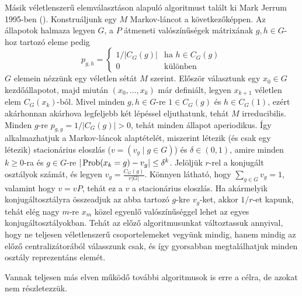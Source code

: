 Másik véletlenszerű elemválasztáson alapuló algoritmust talált ki Mark Jerrum 1995-ben (\cite{Jer95}).
Konstruáljunk egy $M$ Markov-láncot a következőképpen.
Az állapotok halmaza legyen $G$, a $P$ átmeneti valószínűségek mátrixának $g, h \in G$-hoz tartozó eleme pedig
\begin{equation*}
p_{g,h} =
\begin{cases}
1/|C_G(g)| & \text{ha $h \in C_G(g)$}\\
0 & \text{különben}
\end{cases}
\end{equation*}
$G$ elemein nézzünk egy véletlen sétát $M$ szerint. Először választunk egy $x_0 \in G$ kezdőállapotot, majd miután $(x_0, \dots, x_k)$ már definiált, legyen
$x_{k+1}$ véletlen elem $C_G(x_k)$-ból.
Mivel minden $g,h \in G$-re $1 \in C_G(g)$ és $h \in C_G(1)$, ezért akárhonnan akárhova legfeljebb két lépéssel eljuthatunk, tehát $M$ irreducibilis.
Minden $g$-re $p_{g,g} = 1/|C_G(g)| > 0$, tehát minden állapot aperiodikus.
Így alkalmazhatjuk a Markov-láncok alaptételét, miszerint létezik (és csak egy létezik) stacionárius eloszlás ($v = (v_g \mid g \in G)$) és $\delta \in (0,1)$, amire
minden $k \ge 0$-ra és $g \in G$-re $|\operatorname{Prob}(x_k = g) - v_g| \le \delta^k$.
Jelöljük $r$-rel a konjugált osztályok számát, és legyen $v_g = \frac{C_G(g)}{r|G|}$.
Könnyen látható, hogy $\sum_{g\in G} v_g = 1$, valamint hogy $v = vP$, tehát ez a $v$ a stacionárius eloszlás.
Ha akármelyik konjugáltosztályra összeadjuk az abba tartozó $g$-kre $v_g$-ket, akkor $1/r$-et kapunk, tehát elég nagy $m$-re $x_m$ közel egyenlő valószínűséggel lehet az egyes konjugáltosztályokban.
Tehát az előző algoritmusunkat változtassuk annyival, hogy ne teljesen véletlenszerű csoportelemeket vegyünk mindig, hanem mindig az előző centralizátorából válasszunk csak, és így gyorsabban megtalálhatjuk
minden osztály reprezentáns elemét.

Vannak teljesen más elven működő további algoritmusok is erre a célra, de azokat nem részletezzük.